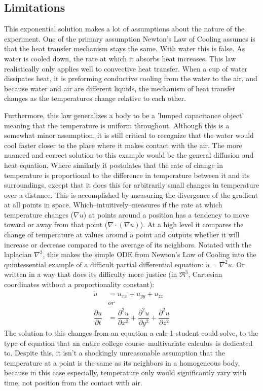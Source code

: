 \documentclass[10pt]{article}
\begin{document}
\subsection{Limitations}
This exponential solution makes a lot of assumptions about the nature of the experiment. One of the primary assumption Newton's Law of Cooling assumes is that the heat transfer mechanism stays the same. With water this is false. As water is cooled down, the rate at which it absorbs heat increases. This law realistically only applies well to convective heat transfer. When a cup of water dissipates heat, it is preforming conductive cooling from the water to the air, and because water and air are different liquids, the mechanism of heat transfer changes as the temperatures change relative to each other.

Furthermore, this law generalizes a body to be a 'lumped capacitance object' meaning that the temperature is uniform throughout. Although this is a somewhat minor assumption, it is still critical to recognize that the water would cool faster closer to the place where it makes contact with the air. The more nuanced and correct solution to this example would be the general diffusion and heat equation. Where similarly it postulates that the rate of change in temperature is proportional to the difference in temperature between it and its surroundings, except that it does this for arbitrarily small changes in temperature over a distance. This is accomplished by measuring the divergence of the gradient at all points in space. Which--intuitively--measures if the rate at which temperature changes ($\nabla u$) at points around a position has a tendency to move toward or away from that point ($\nabla \cdot (\nabla u)$). At a high level it compares the change of temperature at values around a point and outputs whether it will increase or decrease compared to the average of its neighbors. Notated with the laplacian $\nabla^2$, this makes the simple ODE from Newton's Law of Cooling into the quintessential example of a difficult partial differential equation: $\dot{u}=\nabla^2 u$. Or written in a way that does its difficulty more justice (in $\Re^3$, Cartesian coordinates without a proportionality constant):
\begin{align*}
	\dot{u} &= u_{xx} + u_{yy} + u_{zz}\\
	&\textit{or}\\
	\dfrac{\partial u}{\partial t} &= \dfrac{\partial^2 u}{\partial x^2} + \dfrac{\partial^2 u}{\partial y^2} + \dfrac{\partial^2 u}{\partial z^2}
\end{align*}
 The solution to this changes from an equation a calc 1 student could solve, to the type of equation that an entire college course--multivariate calculus--is dedicated to. Despite this, it isn't a shockingly unreasonable assumption that the temperature at a point is the same as its neighbors in a homogeneous body, because in this case especially, temperature only would significantly vary with time, not position from the contact with air.
 
\end{document}

